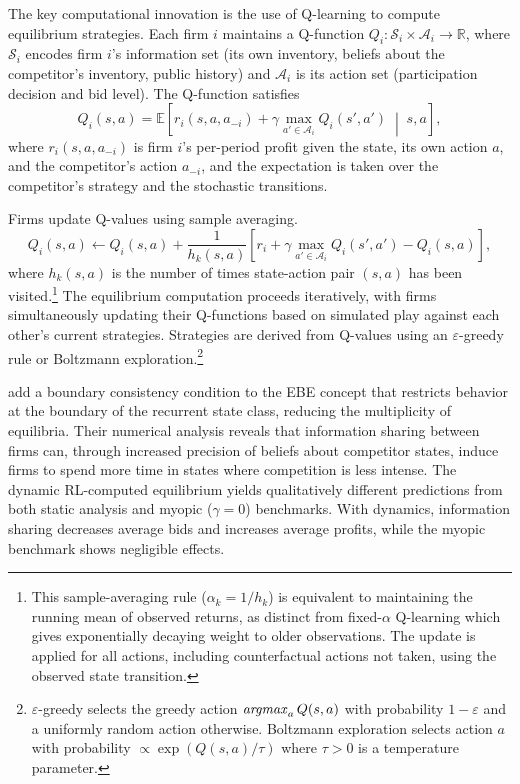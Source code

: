 The key computational innovation is the use of Q-learning to compute equilibrium strategies. Each firm $i$ maintains a Q-function $Q_i: \mathcal{S}_i \times \mathcal{A}_i \to \mathbb{R}$, where $\mathcal{S}_i$ encodes firm $i$'s information set (its own inventory, beliefs about the competitor's inventory, public history) and $\mathcal{A}_i$ is its action set (participation decision and bid level). The Q-function satisfies
\begin{equation}
Q_i(s, a) = \mathbb{E}\left[r_i(s, a, a_{-i}) + \gamma \max_{a' \in \mathcal{A}_i} Q_i(s', a') \;\middle|\; s, a\right], \label{eq:asker_bellman}
\end{equation}
where $r_i(s, a, a_{-i})$ is firm $i$'s per-period profit given the state, its own action $a$, and the competitor's action $a_{-i}$, and the expectation is taken over the competitor's strategy and the stochastic transitions.

Firms update Q-values using sample averaging.
\begin{equation}
Q_i(s, a) \leftarrow Q_i(s, a) + \frac{1}{h_k(s,a)}\left[r_i + \gamma \max_{a' \in \mathcal{A}_i} Q_i(s', a') - Q_i(s, a)\right], \label{eq:asker_qupdate}
\end{equation}
where $h_k(s,a)$ is the number of times state-action pair $(s,a)$ has been visited.\footnote{This sample-averaging rule ($\alpha_k = 1/h_k$) is equivalent to maintaining the running mean of observed returns, as distinct from fixed-$\alpha$ Q-learning which gives exponentially decaying weight to older observations. The update is applied for all actions, including counterfactual actions not taken, using the observed state transition.} The equilibrium computation proceeds iteratively, with firms simultaneously updating their Q-functions based on simulated play against each other's current strategies. Strategies are derived from Q-values using an $\varepsilon$-greedy rule or Boltzmann exploration.\footnote{$\varepsilon$-greedy selects the greedy action $\mathop{\it argmax}_a Q(s,a)$ with probability $1-\varepsilon$ and a uniformly random action otherwise. Boltzmann exploration selects action $a$ with probability $\propto \exp(Q(s,a)/\tau)$ where $\tau > 0$ is a temperature parameter.}

\citet{AskerEtAl2020} add a boundary consistency condition to the EBE concept that restricts behavior at the boundary of the recurrent state class, reducing the multiplicity of equilibria. Their numerical analysis reveals that information sharing between firms can, through increased precision of beliefs about competitor states, induce firms to spend more time in states where competition is less intense. The dynamic RL-computed equilibrium yields qualitatively different predictions from both static analysis and myopic ($\gamma = 0$) benchmarks. With dynamics, information sharing decreases average bids and increases average profits, while the myopic benchmark shows negligible effects.

